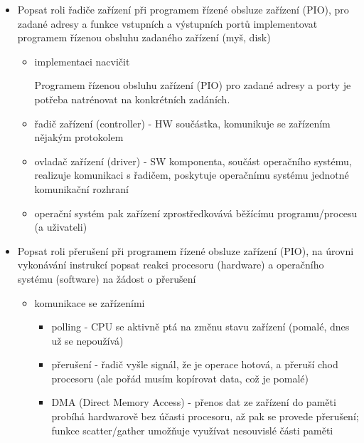 \begin{itemize}
\begin{itemize}
\begin{itemize}
\begin{itemize}
\item takhle fungují Windows
\begin{itemize}
\item mají ještě hardwarovou abstrakční vrstvu, takže mikrokernel je přenositelný
\item služby běží v kernel režimu (což je v rozporu s filozofií mikrokernel)
\end{itemize}
\end{itemize}
\end{itemize}
\end{itemize}
\item Popsat roli řadiče zařízení při programem řízené obsluze zařízení (PIO), pro zadané adresy a funkce vstupních a výstupních portů implementovat programem řízenou obsluhu zadaného zařízení (myš, disk)
\begin{itemize}
\item implementaci nacvičit
\begin{practicebox}
Programem řízenou obsluhu zařízení (PIO) pro zadané adresy a porty je potřeba natrénovat na konkrétních zadáních.
\end{practicebox}
\item řadič zařízení (controller) - HW součástka, komunikuje se zařízením nějakým protokolem
\item ovladač zařízení (driver) - SW komponenta, součást operačního systému, realizuje komunikaci s řadičem, poskytuje operačnímu systému jednotné komunikační rozhraní
\item operační systém pak zařízení zprostředkovává běžícímu programu/procesu (a uživateli)
\end{itemize}
\item Popsat roli přerušení při programem řízené obsluze zařízení (PIO), na úrovni vykonávání instrukcí popsat reakci procesoru (hardware) a operačního systému (software) na žádost o přerušení
\begin{itemize}
\item komunikace se zařízeními
\begin{itemize}
\item polling - CPU se aktivně ptá na změnu stavu zařízení (pomalé, dnes už se nepoužívá)
\item přerušení - řadič vyšle signál, že je operace hotová, a přeruší chod procesoru (ale pořád musím kopírovat data, což je pomalé)
\item DMA (Direct Memory Access) - přenos dat ze zařízení do paměti probíhá hardwarově bez účasti procesoru, až pak se provede přerušení; funkce scatter/gather umožňuje využívat nesouvislé části paměti

\end{itemize}
\end{itemize}
\end{itemize}
